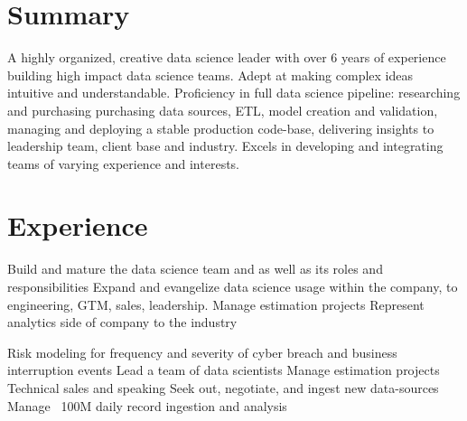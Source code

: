 \documentclass[letterpaper]{deedy-resume} %
\begin{document}
\begin{minipage}[t]{0.66\textwidth} %



\section{Summary}

A highly organized, creative data science leader with over 6 years of experience building high impact data science teams.  Adept at making complex ideas intuitive and understandable.  Proficiency in full data science pipeline: researching and purchasing purchasing data sources, ETL, model creation and validation, managing and deploying a stable production code-base, delivering insights to leadership team, client base and industry.  Excels in developing and integrating teams of varying experience and interests.  



\section{Experience}

\sectionspace %
\vspace{\topsep}

Build and mature the data science team and as well as its roles and responsibilities \textbullet{}  Expand and evangelize data science usage within the company, to engineering, GTM, sales, leadership.  \textbullet{} Manage estimation projects \textbullet{} Represent analytics side of company to the industry



\sectionspace %
\vspace{\topsep}

Risk modeling for frequency and severity of cyber breach and business interruption events \textbullet{}  Lead a team of data scientists \textbullet{} Manage estimation projects \textbullet{} Technical sales and speaking \textbullet{} Seek out, negotiate, and ingest new data-sources \textbullet{} Manage ~100M daily record ingestion and analysis



\end{minipage}
\end{document}
